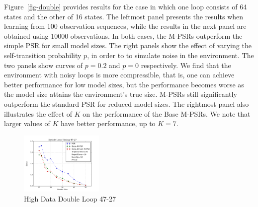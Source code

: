 \documentclass[letterpaper]{article}
\begin{document}

Figure~\ref{fig-double} provides results for the case in which one loop consists of 64 states and the other of 16 states. The leftmost panel presents the results when learning from  100 observation sequences, while the results in the next panel are obtained using 10000 observations. In both cases, the M-PSRs  outperform the simple PSR for small model sizes. The right panels show the effect of 
varying the self-transition probability $p$, in order to to simulate noise in the environment. The two panels show curves of $p=0.2$ and $p=0$ respectively. We find that the environment with noisy loops is more compressible, that is, one can achieve better performance for low model sizes, but the performance becomes worse as the model size attains the environment's true size. M-PSRs still significantly outperform the standard PSR for reduced model sizes.  The rightmost panel also illustrates the effect of $K$ on the performance of the Base M-PSRs. We note that larger values of $K$ have better performance, up to $K=7$.

\begin{figure}[ht!]
\centering
\includegraphics[width=40mm]{47-27-10000.png}\vspace*{-4mm}
\caption{High Data Double Loop 47-27\label{fig-dl47}\vspace*{-4mm}}
\end{figure}
\end{document}
